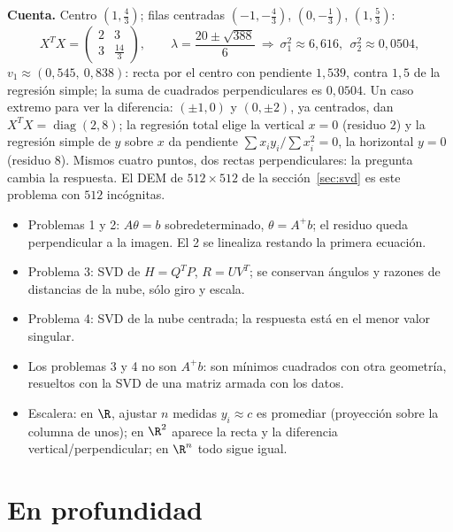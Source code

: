 \textbf{Cuenta.} Centro \((1,\tfrac43)\); filas centradas \((-1,-\tfrac43)\),
\((0,-\tfrac13)\), \((1,\tfrac53)\):
\[
  X^TX=\begin{pmatrix}2&3\\3&\tfrac{14}3\end{pmatrix},\qquad
  \lambda=\frac{20\pm\sqrt{388}}6\ \Rightarrow\ \sigma_1^2\approx6{,}616,\ \ \sigma_2^2\approx0{,}0504,
\]
\(v_1\approx(0{,}545,\ 0{,}838)\): recta por el centro con pendiente \(1{,}539\), contra
\(1{,}5\) de la regresión simple; la suma de cuadrados perpendiculares es \(0{,}0504\).
Un caso extremo para ver la diferencia: \((\pm1,0)\) y \((0,\pm2)\), ya centrados, dan
\(X^TX=\operatorname{diag}(2,8)\); la regresión total elige la vertical \(x=0\) (residuo
\(2\)) y la regresión simple de \(y\) sobre \(x\) da pendiente
\(\sum x_iy_i/\sum x_i^2=0\), la horizontal \(y=0\) (residuo \(8\)). Mismos cuatro
puntos, dos rectas perpendiculares: la pregunta cambia la respuesta. El DEM de
\(512\times512\) de la sección~\ref{sec:svd} es este problema con \(512\) incógnitas.

\begin{resultado}
\begin{itemize}
  \item Problemas 1 y 2: \(A\theta=b\) sobredeterminado, \(\theta=A^{+}b\); el residuo
  queda perpendicular a la imagen. El 2 se linealiza restando la primera ecuación.
  \item Problema 3: SVD de \(H=Q^TP\), \(R=UV^T\); se conservan ángulos y razones de
  distancias de la nube, sólo giro y escala.
  \item Problema 4: SVD de la nube centrada; la respuesta está en el menor valor singular.
  \item Los problemas 3 y 4 no son \(A^{+}b\): son mínimos cuadrados con otra geometría,
  resueltos con la SVD de una matriz armada con los datos.
  \item Escalera: en \(\R\), ajustar \(n\) medidas \(y_i\approx c\) es promediar
  (proyección sobre la columna de unos); en \(\R^2\) aparece la recta y la diferencia
  vertical/perpendicular; en \(\R^n\) todo sigue igual.
\end{itemize}
\end{resultado}

\section{En profundidad}


